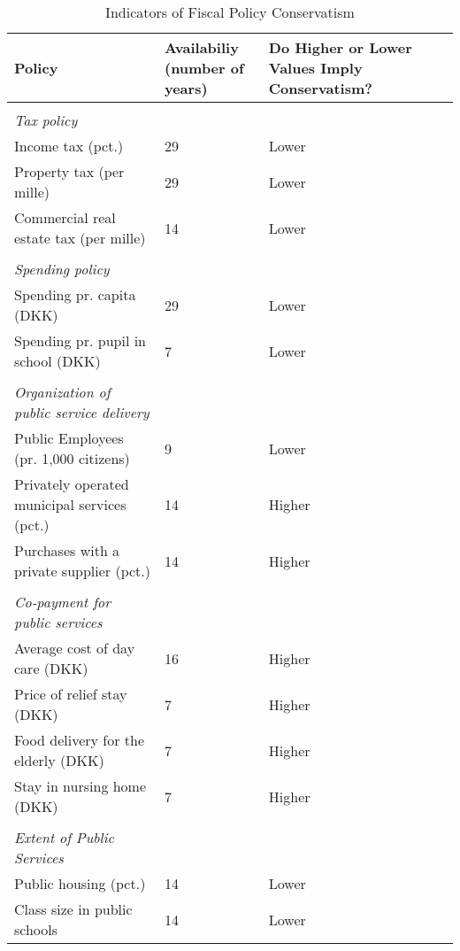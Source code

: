\begin{table}[h]
	\centering \footnotesize
	\caption{Indicators of Fiscal Policy Conservatism}
	\label{tab:policies} 
	\begin{tabular}{p{5.5cm}P{3cm}P{4.5cm}} \hline
		\textbf{Policy}                          & \textbf{Availabiliy \newline (number of years)} & \textbf{Do Higher or Lower Values Imply Conservatism?} \\
		\hline
		&&\\ \textit{Tax policy} &&\\
		Income tax (pct.)                        & 29     &    Lower       \\
		Property tax (per mille)                      & 29    &    Lower        \\
		Commercial real estate tax (per mille) & 14    &    Lower               \\ \hline
	
		&&\\ \textit{Spending policy}  &&\\
		Spending pr. capita (DKK)                & 29    &    Lower        \\
		Spending pr. pupil in school (DKK)       & 7     &    Lower     \\ \hline
		
		&&\\\textit{Organization of public service delivery}  &&\\
 		Public Employees (pr. 1,000 citizens)	 & 9	  &	   Lower	     \\
 		Privately operated municipal services  (pct.) &   14  &    Higher     \\
 		Purchases with a private supplier  (pct.)      & 14    &    Higher     \\ \hline
 	
 		&&\\ \textit{Co-payment for public services} &&\\   
		Average cost of day care (DKK)                  & 16    &    Higher     \\
		Price of relief stay (DKK)				 & 7	  &	   Higher	 \\
		Food delivery for the  elderly (DKK) & 7   &    Higher     \\
		Stay in nursing home (DKK)              & 7     &    Higher     \\ \hline
	
		&&\\ \textit{Extent of Public Services} &&\\ 
		Public housing (pct.)                    & 14     &    Lower               \\
		Class size in public schools	         & 14    &    Lower       \\
		\hline \hline
		\end{tabular}
\end{table} 